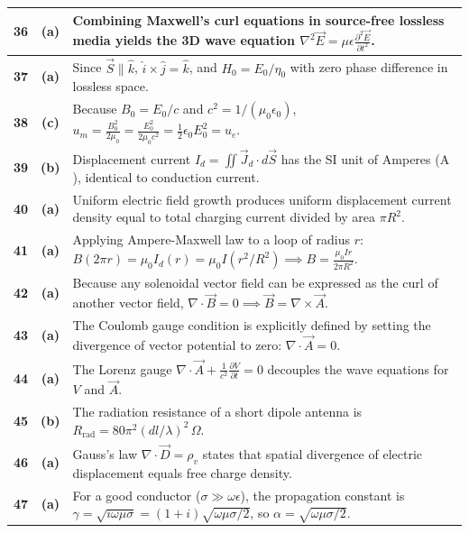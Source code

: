 {\begin{tabularx}{\textwidth}{|c|c|X|}
\textbf{36} & \textbf{(a)} & Combining Maxwell's curl equations in source-free lossless media yields the 3D wave equation $\nabla^2 \vec{E} = \mu\epsilon \frac{\partial^2\vec{E}}{\partial t^2}$. \\ \hline
\textbf{37} & \textbf{(a)} & Since $\vec{S} \parallel \hat{k}$, $\hat{i} \times \hat{j} = \hat{k}$, and $H_0 = E_0/\eta_0$ with zero phase difference in lossless space. \\ \hline
\textbf{38} & \textbf{(c)} & Because $B_0 = E_0/c$ and $c^2 = 1/(\mu_0\epsilon_0)$, $u_m = \frac{B_0^2}{2\mu_0} = \frac{E_0^2}{2\mu_0 c^2} = \frac{1}{2}\epsilon_0 E_0^2 = u_e$. \\ \hline
\textbf{39} & \textbf{(b)} & Displacement current $I_d = \iint \vec{J}_d \cdot d\vec{S}$ has the SI unit of Amperes ($\text{A}$), identical to conduction current. \\ \hline
\textbf{40} & \textbf{(a)} & Uniform electric field growth produces uniform displacement current density equal to total charging current divided by area $\pi R^2$. \\ \hline
\textbf{41} & \textbf{(a)} & Applying Ampere-Maxwell law to a loop of radius $r$: $B(2\pi r) = \mu_0 I_d(r) = \mu_0 I (r^2/R^2) \implies B = \frac{\mu_0 I r}{2\pi R^2}$. \\ \hline
\textbf{42} & \textbf{(a)} & Because any solenoidal vector field can be expressed as the curl of another vector field, $\nabla \cdot \vec{B} = 0 \implies \vec{B} = \nabla \times \vec{A}$. \\ \hline
\textbf{43} & \textbf{(a)} & The Coulomb gauge condition is explicitly defined by setting the divergence of vector potential to zero: $\nabla \cdot \vec{A} = 0$. \\ \hline
\textbf{44} & \textbf{(a)} & The Lorenz gauge $\nabla \cdot \vec{A} + \frac{1}{c^2}\frac{\partial V}{\partial t} = 0$ decouples the wave equations for $V$ and $\vec{A}$. \\ \hline
\textbf{45} & \textbf{(b)} & The radiation resistance of a short dipole antenna is $R_{\text{rad}} = 80\pi^2 (dl/\lambda)^2\,\Omega$. \\ \hline
\textbf{46} & \textbf{(a)} & Gauss's law $\nabla \cdot \vec{D} = \rho_v$ states that spatial divergence of electric displacement equals free charge density. \\ \hline
\textbf{47} & \textbf{(a)} & For a good conductor ($\sigma \gg \omega\epsilon$), the propagation constant is $\gamma = \sqrt{i\omega\mu\sigma} = (1+i)\sqrt{\omega\mu\sigma/2}$, so $\alpha = \sqrt{\omega\mu\sigma/2}$. \\ \hline

\end{tabularx}}
